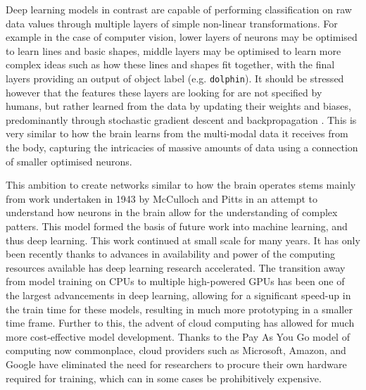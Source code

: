 Deep learning models in contrast are capable of performing classification on raw data values through multiple layers of simple non-linear transformations. For example in the case of computer vision, lower layers of neurons may be optimised to learn lines and basic shapes, middle layers may be optimised to learn more complex ideas such as how these lines and shapes fit together, with the final layers providing an output of object label (e.g. \texttt{dolphin}). It should be stressed however that the features these layers are looking for are not specified by humans, but rather learned from the data by updating their weights and biases, predominantly through stochastic gradient descent and backpropagation  \cite{hecht-nielsen_iii.3_1992}. This is very similar to how the brain learns from the multi-modal data it receives from the body, capturing the intricacies of massive amounts of data using a connection of smaller optimised neurons. 

This ambition to create networks similar to how the brain operates stems mainly from work undertaken in 1943 by McCulloch and Pitts \cite{mcculloch_logical_1943} in an attempt to understand how neurons in the brain allow for the understanding of complex patters. This model formed the basis of future work into machine learning, and thus deep learning. This work continued at small scale for many years. It has only been recently thanks to advances in availability and power of the computing resources available has deep learning research accelerated. The transition away from model training on CPUs to multiple high-powered GPUs has been one of the largest advancements in deep learning, allowing for a significant speed-up in the train time for these models, resulting in much more prototyping in a smaller time frame. Further to this, the advent of cloud computing has allowed for much more cost-effective model development. Thanks to the Pay As You Go model of computing now commonplace, cloud providers such as Microsoft, Amazon, and Google have eliminated the need for researchers to procure their own hardware required for training, which can in some cases be prohibitively expensive. 

